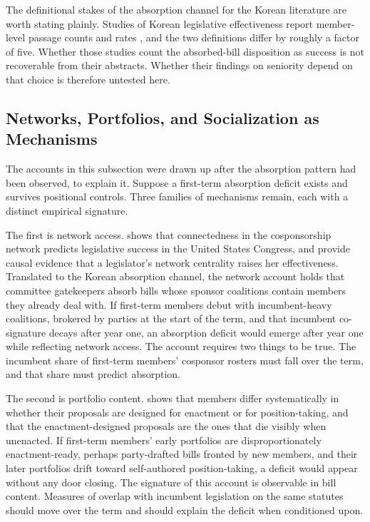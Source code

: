 \documentclass[11pt]{article}
\begin{document}
The definitional stakes of the absorption channel for the Korean literature are worth stating plainly. Studies of Korean legislative effectiveness report member-level passage counts and rates \citep{an2025, jeong2016, ka2025a}, and the two definitions differ by roughly a factor of five. Whether those studies count the absorbed-bill disposition as success is not recoverable from their abstracts. Whether their findings on seniority depend on that choice is therefore untested here.

\subsection{Networks, Portfolios, and Socialization as Mechanisms}

The accounts in this subsection were drawn up after the absorption pattern had been observed, to explain it. Suppose a first-term absorption deficit exists and survives positional controls. Three families of mechanisms remain, each with a distinct empirical signature.

The first is network access. \citet{fowler2006} shows that connectedness in the cosponsorship network predicts legislative success in the United States Congress, and \citet{battaglini2020} provide causal evidence that a legislator's network centrality raises her effectiveness. Translated to the Korean absorption channel, the network account holds that committee gatekeepers absorb bills whose sponsor coalitions contain members they already deal with. If first-term members debut with incumbent-heavy coalitions, brokered by parties at the start of the term, and that incumbent co-signature decays after year one, an absorption deficit would emerge after year one while reflecting network access. The account requires two things to be true. The incumbent share of first-term members' cosponsor rosters must fall over the term, and that share must predict absorption.

The second is portfolio content. \citet{gelman2024} shows that members differ systematically in whether their proposals are designed for enactment or for position-taking, and that the enactment-designed proposals are the ones that die visibly when unenacted. If first-term members' early portfolios are disproportionately enactment-ready, perhaps party-drafted bills fronted by new members, and their later portfolios drift toward self-authored position-taking, a deficit would appear without any door closing. The signature of this account is observable in bill content. Measures of overlap with incumbent legislation on the same statutes should move over the term and should explain the deficit when conditioned upon.
\end{document}
